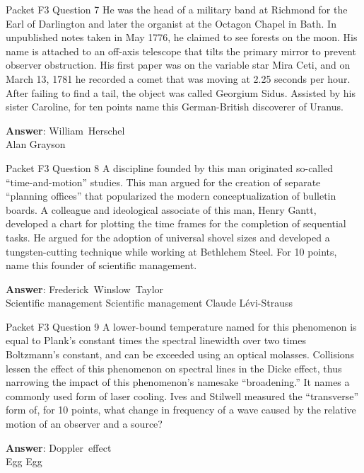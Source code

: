 \begin{frame}{Packet F3 Question 7}
He was the head of a military band at Richmond   for the Earl of Darlington and later the organist at the Octagon Chapel in Bath. In unpublished notes taken in May 1776, he claimed to see forests on the moon. His name is attached to an off-axis telescope that tilts   the primary mirror to prevent observer obstruction. His first paper was on the variable star Mira Ceti, and on March 13, 1781 he recorded   a comet that was moving at 2.25 seconds per hour. After failing to find a tail,   the object was called Georgium Sidus. Assisted by his sister Caroline, for ten points   name this German-British discoverer of Uranus.

\textbf{Answer}: William\ Herschel\\
 Alan Grayson
\end{frame}

\begin{frame}{Packet F3 Question 8}
A discipline founded by this man originated so-called “time-and-motion” studies. This man argued for the creation of separate “planning offices” that popularized the modern conceptualization of bulletin boards. A colleague and ideological associate of this man, Henry Gantt, developed a chart for plotting   the time frames for the completion of sequential tasks. He argued for the adoption of universal shovel sizes and developed a tungsten-cutting technique while working at Bethlehem Steel. For 10 points,     name this founder of scientific management.  

\textbf{Answer}: Frederick\ Winslow\ Taylor\\
 Scientific management
 Scientific management
 Claude Lévi-Strauss
\end{frame}

\begin{frame}{Packet F3 Question 9}
A lower-bound temperature     named for this phenomenon is equal to Plank’s constant times the spectral linewidth   over two times Boltzmann’s constant, and can be exceeded using an optical molasses. Collisions lessen the effect of this phenomenon on spectral lines in the Dicke effect, thus narrowing the impact of this phenomenon’s namesake “broadening.” It names a commonly used form of laser cooling. Ives and Stilwell measured   the “transverse”   form of, for 10 points, what change in frequency of a wave   caused by the relative motion of an observer and a source?

\textbf{Answer}: Doppler\ effect\\
 Egg
 Egg
\end{frame}

